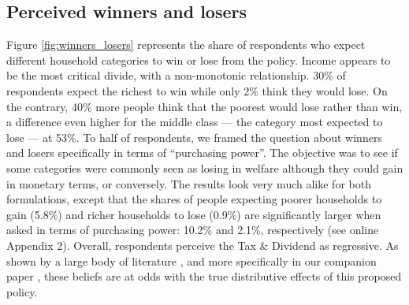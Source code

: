 \documentclass[english,5p,authoryear]{elsarticle}
\begin{document}
%

%

%
%

%
%
%

    \subsection{Perceived winners and losers}

Figure \ref{fig:winners_losers} represents the share of respondents who expect different household categories to win or lose from the policy. Income appears to be the most critical divide, with a non-monotonic relationship. 30\% of respondents expect the richest to win while only 2\% think they would lose. On the contrary, 40\% more people think that the poorest would lose rather than win, a difference even higher for the middle class --- the category most expected to lose --- at 53\%. To half of respondents, we framed the question about winners and losers specifically in terms of ``purchasing power''. The objective was to see if some categories were commonly seen as losing in welfare although they could gain in monetary terms, or conversely. The results look very much alike for both formulations, except that the shares of people expecting poorer households to gain (5.8\%) and richer households to lose (0.9\%) are significantly larger when asked in terms of purchasing power: 10.2\% and 2.1\%, respectively (see online Appendix 2). Overall, respondents perceive the Tax \& Dividend as regressive. As shown by a large body of literature \citep[e.g.][]{west_williams_04,bento_distributional_2009,williams_initial_2015}, and more specifically in our companion paper \citep{douenne_can_2019}, these beliefs are at odds with the true distributive effects of this proposed policy. %
%
\end{document}
